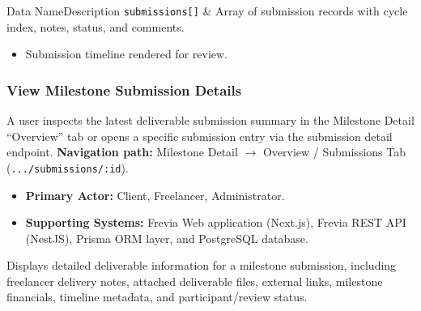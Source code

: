 \begin{specdatatable}{Data Name}{Description}
      \texttt{submissions[]} & Array of submission records with cycle index, notes, status, and comments.\\ \hline
\end{specdatatable}

\begin{itemize}[leftmargin=1.6em,topsep=3pt,itemsep=2pt,parsep=0pt,label=$\bullet$]
      \item Submission timeline rendered for review.
\end{itemize}

\subsubsection{ View Milestone Submission Details}

A user inspects the latest deliverable submission summary in the Milestone Detail ``Overview'' tab or opens a specific submission entry via the submission detail endpoint.\newline
\textbf{Navigation path:} Milestone Detail $\rightarrow$ Overview / Submissions Tab (\texttt{.../submissions/:id}).


\begin{itemize}[leftmargin=1.6em,topsep=3pt,itemsep=2pt,parsep=0pt,label=$\bullet$]
      \item \textbf{Primary Actor:} Client, Freelancer, Administrator.
      \item \textbf{Supporting Systems:} Frevia Web application (Next.js), Frevia REST API (NestJS), Prisma ORM layer, and PostgreSQL database.
\end{itemize}

\noindent Displays detailed deliverable information for a milestone submission, including freelancer delivery notes, attached deliverable files, external links, milestone financials, timeline metadata, and participant/review status.

